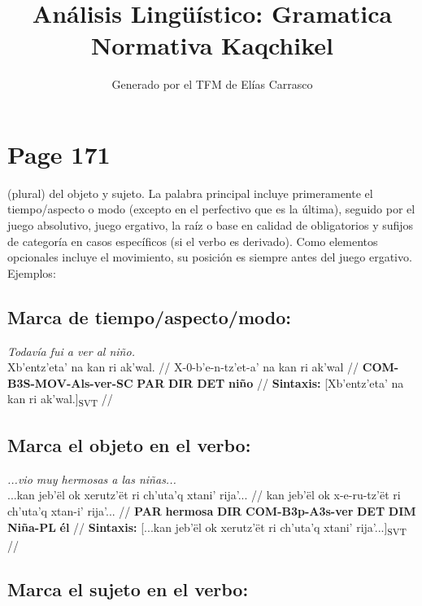 \documentclass{article}%
\title{Análisis Lingüístico: Gramatica Normativa Kaqchikel}%
\author{Generado por el TFM de Elías Carrasco}%
\begin{document}
%
\normalsize%
\maketitle%
\section{Page 171}%
\label{sec:Page171}%
(plural) del objeto y sujeto. La palabra principal incluye primeramente el tiempo/aspecto %
o modo (excepto en el perfectivo que es la última), seguido por el juego absolutivo, %
juego ergativo, la raíz o base en calidad de obligatorios y sufijos de categoría en casos %
específicos (si el verbo es derivado). Como elementos opcionales incluye el movimiento, %
su posición es siempre antes del juego ergativo. Ejemplos: %
\subsection{Marca de tiempo/aspecto/modo:}%
\label{subsec:Marcadetiempo/aspecto/modo}%

%
\par\medskip%
\ex
\textit{Todavía fui a ver al niño.} \\
\begingl
\gla Xb'entz'eta' na kan ri ak'wal. //
\glb X-0-b'e-n-tz'et-a' na kan ri ak'wal //
\glc \textbf{COM-}\textbf{B3S-}\textbf{MOV-}\textbf{Als-}\textbf{ver-}\textbf{SC} \textbf{PAR} \textbf{DIR} \textbf{DET} \textbf{niño} //
\glft \textbf{Sintaxis:} [Xb'entz'eta' na kan ri ak'wal.]\textsubscript{SVT} //
\endgl
\xe
%
\medskip%
\subsection{Marca el objeto en el verbo:}%
\label{subsec:Marcaelobjetoenelverbo}%

%
\par\medskip%
\ex
\textit{...vio muy hermosas a las niñas...} \\
\begingl
\gla ...kan jeb'ël ok xerutz'ët ri ch'uta'q xtani' rija'... //
\glb kan jeb'ël ok x-e-ru-tz'ët ri ch'uta'q xtan-i' rija'... //
\glc \textbf{PAR} \textbf{hermosa} \textbf{DIR} \textbf{COM-}\textbf{B3p-}\textbf{A3s-}\textbf{ver} \textbf{DET} \textbf{DIM} \textbf{Niña-}\textbf{PL} \textbf{él} //
\glft \textbf{Sintaxis:} [...kan jeb'ël ok xerutz'ët ri ch'uta'q xtani' rija'...]\textsubscript{SVT} //
\endgl
\xe
%
\medskip%
\subsection{Marca el sujeto en el verbo:}%
\label{subsec:Marcaelsujetoenelverbo}%
\end{document}
